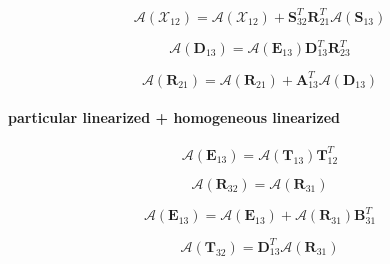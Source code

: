 \begin{equation}
\mathcal{A}(\mathcal{X}_{12}) = \mathcal{A}(\mathcal{X}_{12}) + \mathbf{S}^{T}_{32}\mathbf{R}^{T}_{21}\mathcal{A}(\mathbf{S}_{13})
\label{eq:adding-downward-adjoint_of_tangent_linear-homogeneous_linearized_p_unlinearized-t12_a2}
\end{equation}

\begin{equation}
\mathcal{A}(\mathbf{D}_{13}) = \mathcal{A}(\mathbf{E}_{13})\mathbf{D}^{T}_{13}\mathbf{R}^{T}_{23}
\label{eq:adding-downward-adjoint_of_tangent_linear-homogeneous_linearized_p_unlinearized-D13_a}
\end{equation}

\begin{equation}
\mathcal{A}(\mathbf{R}_{21}) = \mathcal{A}(\mathbf{R}_{21}) + \mathbf{A}^{T}_{13}\mathcal{A}(\mathbf{D}_{13})
\label{eq:adding-downward-adjoint_of_tangent_linear-homogeneous_linearized_p_unlinearized-R21_a2}
\end{equation}


\paragraph{particular linearized + homogeneous linearized}
\label{sec:adding-downward-adjoint_of_tangent_linear-particular_linearized_p_homogeneous_linearized}

\begin{equation}
\mathcal{A}(\mathbf{E}_{13}) = \mathcal{A}(\mathbf{T}_{13})\mathbf{T}^{T}_{12}
\label{eq:adding-downward-adjoint_of_tangent_linear-particular_linearized_p_homogeneous_linearized-E13_a}
\end{equation}

\begin{equation}
\mathcal{A}(\mathbf{R}_{32}) = \mathcal{A}(\mathbf{R}_{31})
\label{eq:adding-downward-adjoint_of_tangent_linear-particular_linearized_p_homogeneous_linearized-R32_a}
\end{equation}

\begin{equation}
\mathcal{A}(\mathbf{E}_{13}) = \mathcal{A}(\mathbf{E}_{13}) + \mathcal{A}(\mathbf{R}_{31})\mathbf{B}^{T}_{31}
\label{eq:adding-downward-adjoint_of_tangent_linear-particular_linearized_p_homogeneous_linearized-E13_a2}
\end{equation}

\begin{equation}
\mathcal{A}(\mathbf{T}_{32}) = \mathbf{D}^{T}_{13}\mathcal{A}(\mathbf{R}_{31})
\label{eq:adding-downward-adjoint_of_tangent_linear-particular_linearized_p_homogeneous_linearized-T32_a}
\end{equation}

